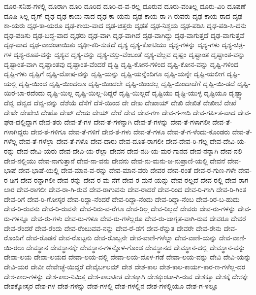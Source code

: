 {ದೂರ-ಸನಿಹ-ಗಳಲ್ಲಿ
ದೂರಾಗಿ
ದೂರಿ
ದೂರಿದ
ದೂರಿ-ದ-ವ-ರಲ್ಲ
ದೂರುವ
ದೂರು-ವಂತಿಲ್ಲ
ದೂರು-ವಿರಿ
ದೂಷಣೆ
ದೂಷಿ-ಸಿಲ್ಲ
ದೃಗ್
ದೃಢ
ದೃಢ-ಕಾಯ-ನಾದ
ದೃಢ-ಕಾ-ಯನು
ದೃಢ-ಕಾಯ-ರಾ-ಗಿ-ರುವರು
ದೃಢ-ಕಾಯ-ರಾದ
ದೃಢ-ಕಾ-ಯರು
ದೃಢ-ಕಾ-ಯರೂ
ದೃಢ-ಕಾಯ-ವಾದ
ದೃಢ-ಚಿತ್ತರು
ದೃಢತೆ
ದೃಢ-ನಿಶ್ಚಯ
ದೃಢ-ಪಡಿಸಿ
ದೃಢ-ಪಡಿ-ಸಿ-ದನು
ದೃಢ-ಪಡಿಸು
ದೃಢ-ಬದ್ಧ-ವಾದ
ದೃಢರು
ದೃಢ-ವಾಗಿ
ದೃಢ-ವಾಗಿದೆ
ದೃಢ-ವಾಗಿದ್ದು
ದೃಢ-ವಾಗುತ್ತದೆ
ದೃಢ-ವಾಗುತ್ತವೆ
ದೃಢ-ವಾದ
ದೃಢ-ವಾದಂತಾಯಿತು
ದೃಢೀ-ಕರಿ-ಸುತ್ತದೆ
ದೃಶ್ಯ
ದೃಶ್ಯ-ಕೋಟಿಯು
ದೃಶ್ಯ-ಗಳನ್ನು
ದೃಶ್ಯ-ಗಳು
ದೃಶ್ಯ-ಚಿತ್ರ-ಗಳ
ದೃಶ್ಯ-ರೂಪ-ವನ್ನು
ದೃಶ್ಯವ
ದೃಶ್ಯ-ವನ್ನು
ದೃಶ್ಯ-ವಸ್ತು-ವೆಂಬಂತೆ
ದೃಶ್ಯ-ವೆಲ್ಲವ
ದೃಷ್ಟಂ
ದೃಷ್ಟಾಂತ
ದೃಷ್ಟಾಂತ-ವನ್ನು
ದೃಷ್ಟಾಂತ-ವಾಗಿ
ದೃಷ್ಟಾಂತವು
ದೃಷ್ಟಾಂತ-ವೆಂದರೆ
ದೃಷ್ಟಿ
ದೃಷ್ಟಿ-ಕೋನ-ಗಳಿಂದ
ದೃಷ್ಟಿ-ಕೋನ-ವನ್ನು
ದೃಷ್ಟಿ-ಗಳಿಂದ
ದೃಷ್ಟಿ-ಗಳು
ದೃಷ್ಟಿಗೆ
ದೃಷ್ಟಿ-ದೋಷ-ವನ್ನು
ದೃಷ್ಟಿ-ಯನ್ನು
ದೃಷ್ಟಿ-ಯನ್ನೆಂದಿಗೂ
ದೃಷ್ಟಿ-ಯನ್ನೇ
ದೃಷ್ಟಿ-ಯಲೀಗ
ದೃಷ್ಟಿ-ಯಲ್ಲಿ
ದೃಷ್ಟಿ-ಯಿಂದ
ದೃಷ್ಟಿ-ಯಿಂದಲೂ
ದೃಷ್ಟಿ-ಯಿಂದಲೇ
ದೃಷ್ಟಿ-ಯಿಂದಲ್ಲ
ದೃಷ್ಟಿ-ಯಿಂದಾಚೆಗೆ
ದೃಷ್ಟಿ-ಯಿ-ಡದೆ
ದೃಷ್ಟಿ-ಯಿರ-ಬಾ-ರದೆಂದು
ದೃಷ್ಟಿ-ಯಿಲ್ಲ
ದೃಷ್ಟಿ-ಯಿಲ್ಲ-ದಿದ್ದರೆ
ದೃಷ್ಟಿ-ಯಿಲ್ಲದೆ
ದೃಷ್ಟಿಯು
ದೃಷ್ಟಿ-ಯುಳ್ಳ
ದೃಷ್ಟಿಯೂ
ದೃಷ್ಟ್ವಾ
ದೆವ್ವ
ದೆವ್ವದ
ದೆವ್ವ-ವನ್ನು
ದೆಶೆಯೆ
ದೆಸೆಗೆ
ದೆಸೆ-ಯಿಂದ
ದೇ
ದೇಖ
ದೇಖಾಯ್
ದೇಖಿ
ದೇಖಿತೆ
ದೇಖೀಬೆ
ದೇಖೆ
ದೇಖೇ
ದೇಖೇಚಿ
ದೇಖೊ
ದೇಖ್
ದೇಯ
ದೇಯ್
ದೇರೆ
ದೇವ
ದೇವ-ಗಣ
ದೇವ-ಗ-ಣದಿ
ದೇವ-ಗರ್ಪಿತ-ವಾದ
ದೇವ-ಘಡ-ದಲ್ಲಿದ್ದಾಗ
ದೇವ-ತರು
ದೇವ-ತೆ-ಗಳ
ದೇವ-ತೆ-ಗಳನ್ನಾಗಿ
ದೇವ-ತೆ-ಗಳನ್ನು
ದೇವ-ತೆ-ಗಳಾಗಲೀ
ದೇವ-ತೆ-ಗಳಾಗಿದ್ದರು
ದೇವ-ತೆ-ಗಳಿಗೂ
ದೇವ-ತೆ-ಗಳಿಗೆ
ದೇವ-ತೆ-ಗಳು
ದೇವ-ತೆ-ಗಳೂ
ದೇವ-ತೆ-ಗ-ಳೆಂದು-ಕೊಂಡರು
ದೇವ-ತೆ-ಗಳೆಲ್ಲ
ದೇವ-ತೆ-ಗಳೆಲ್ಲಾ
ದೇವ-ತೆ-ಗಳೊ
ದೇವ-ದಾರು
ದೇವ-ದೂತ-ರಾಗಲೀ
ದೇವ-ದೇವ-ರಿ-ಗೆಲ್ಲ
ದೇವ-ದೇವಿ-ಯ-ರನ್ನು
ದೇವ-ದೇವಿ-ಯರು
ದೇವ-ದೇವಿ-ಯ-ರೆಲ್ಲಾ
ದೇವನ
ದೇವ-ನದಿ-ಯ-ಮರ-ಗಾನದ
ದೇವ-ನನ್ನಾಗಿ
ದೇವ-ನಲಿ
ದೇವ-ನಲ್ಲಿಯು
ದೇವ-ನಾಗುತ್ತಾನೆ
ದೇವ-ನಾ-ವನು
ದೇವನು
ದೇವ-ನು-ಮನು-ಜ-ನುಪ್ರಾಣಿ-ಯಲ್ಲಿ
ದೇವನೆ
ದೇವ-ಭಾಷೆ
ದೇವ-ಭಾಷೆ-ಯಲ್ಲಿ
ದೇವ-ಮಾನ-ವ-ರನ್ನು
ದೇವ-ಮಾನ-ವರು
ದೇವರ
ದೇವ-ರಂತೆ
ದೇವ-ರ-ಗುಣ-ಗಳೇ
ದೇವ-ರ-ಡಿಗೆ
ದೇವ-ರನ್ನಾಗಲೀ
ದೇವ-ರನ್ನು
ದೇವ-ರ-ಮ-ನೆಗೆ
ದೇವ-ರ-ಮನೆ-ಯನ್ನು
ದೇವ-ರಲ್ಲದೆ
ದೇವ-ರಲ್ಲಿ
ದೇವ-ರಾಗ-ಲಾರ
ದೇವ-ರಾಗಲೀ
ದೇವ-ರಾ-ಗಿ-ರುವೆ
ದೇವ-ರಾಗುವನು
ದೇವ-ರಾದರೆ
ದೇವ-ರಿಂದ
ದೇವ-ರಿ-ಗಾಗಿ
ದೇವ-ರಿ-ಗಿಂತ
ದೇವ-ರಿಗೆ
ದೇವ-ರಿ-ಗೋಸ್ಕರ
ದೇವ-ರಿದ್ದಾ-ನೆಂದರೆ
ದೇವ-ರಿದ್ದಾ-ನೆಂದು
ದೇವ-ರಿದ್ದಾ-ನೆಂಬ
ದೇವ-ರಿರ-ಬ-ಹುದು
ದೇವ-ರಿ-ರುವನು
ದೇವ-ರಿ-ರುವನೇ
ದೇವ-ರಿರು-ವ-ರೆಗೂ
ದೇವ-ರಿಲ್ಲ
ದೇವ-ರಿಲ್ಲದೆ
ದೇವರು
ದೇವ-ರು-ಗಳನ್ನು
ದೇವ-ರು-ಗಳನ್ನೂ
ದೇವ-ರು-ಗಳು
ದೇವ-ರು-ಗಳೂ
ದೇವ-ರು-ಗಳೆಲ್ಲರೂ
ದೇವ-ರು-ಜಾಗೃತ-ವಾಗಿ-ರುವ
ದೇವರೂ
ದೇವರೆ
ದೇವ-ರೆಂದರೆ
ದೇವ-ರೆಂದು
ದೇವ-ರೆಂಬುವವ-ನನ್ನು
ದೇವ-ರೆ-ಡೆಗೆ
ದೇವ-ರೆನ್ನುತ
ದೇವರೇ
ದೇವ-ರೇನು
ದೇವ-ರೊಂದಿಗೆ
ದೇವ-ರೊಡನೆ
ದೇವ-ರೊಬ್ಬನು
ದೇವ-ರೊಬ್ಬನೇ
ದೇವ-ವಾಣಿ-ಗಳೆಲ್ಲಾ
ದೇವ-ವಾಣಿ-ಯನ್ನು
ದೇವ-ವಾಣಿ-ಯಿ-ರಲು
ದೇವಸ್ಥಾನ
ದೇವಸ್ಥಾನಕ್ಕೇ
ದೇವಸ್ಥಾನ-ಗಳನ್ನೊಳ-ಗೊಂಡ
ದೇವಸ್ಥಾನದ
ದೇವಸ್ಥಾನ-ದಲ್ಲಿ
ದೇವಸ್ಥಾನ-ವನ್ನು
ದೇವಾ-ಲಯ
ದೇವಾ-ಲಯದ
ದೇವಾ-ಲಯ-ದಲ್ಲಿ
ದೇವಾ-ಲಯ-ದೊಳ-ಗಡೆ
ದೇವಾ-ಲಯ-ವನ್ನು
ದೇವಿ
ದೇವಿ-ಯನ್ನು
ದೇವಿ-ಯರ
ದೇವೀ
ದೇವೇಚ್ಛೆ-ಯಿದ್ದರೆ
ದೇವೈರ್ಬಲಮ್
ದೇಶ
ದೇಶ-ಕಾಲ
ದೇಶ-ಕಾಲ-ಕಾರ್ಯ-ಕಾರ-ಣ-ಗಳೆಲ್ಲ-ದರ
ದೇಶ-ಕಾಲ-ಗಳನ್ನು
ದೇಶ-ಕಾಲ-ನಿಮಿತ್ತ
ದೇಶ-ಕಾಲಾತೀತ
ದೇಶಕ್ಕಾಗಿ
ದೇಶಕ್ಕುಂಟಾ-ಗಿ-ರುವ
ದೇಶಕ್ಕೂ
ದೇಶಕ್ಕೆ
ದೇಶಕ್ಕೇ
ದೇಶಕ್ಕೋಸ್ಕರ
ದೇಶ-ಗಳ
ದೇಶ-ಗಳನ್ನು
ದೇಶ-ಗಳಲ್ಲಿ
ದೇಶ-ಗಳಲ್ಲಿನ
ದೇಶ-ಗಳಲ್ಲಿಯೂ
ದೇಶ-ಗ-ಳಲ್ಲೂ
}
